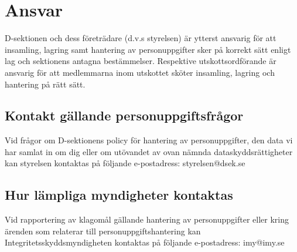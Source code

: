 \documentclass{dsekprotokoll}
\begin{document}
\section{Ansvar}
D-sektionen och dess företrädare (d.v.s styrelsen) är ytterst ansvarig för att insamling, lagring samt hantering av personuppgifter sker på korrekt sätt enligt lag och sektionens antagna bestämmelser. Respektive utskottsordförande är ansvarig för att medlemmarna inom utskottet
sköter insamling, lagring och hantering på rätt sätt.

\subsection{Kontakt gällande personuppgiftsfrågor}
Vid frågor om D-sektionens policy för hantering av personuppgifter, den data vi har samlat in
om dig eller om utövandet av ovan nämnda dataskyddsrättigheter kan styrelsen kontaktas på
följande e-postadress: styrelsen@dsek.se

\subsection{Hur lämpliga myndigheter kontaktas}
Vid rapportering av klagomål gällande hantering av personuppgifter eller kring ärenden som
relaterar till personuppgiftshantering kan Integritetsskyddsmyndigheten kontaktas på följande e-postadress: imy@imy.se
\end{document}
